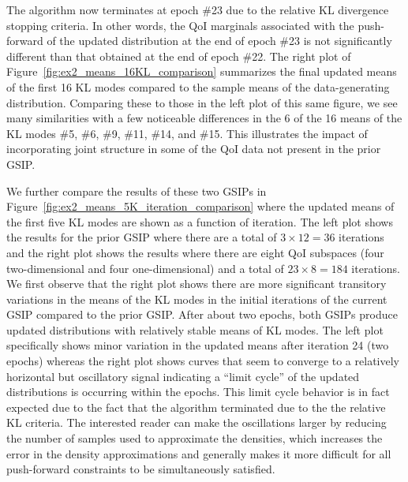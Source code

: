 \documentclass{article}
\begin{document}
The algorithm now terminates at epoch \#23 due to the relative KL divergence stopping criteria.
In other words, the QoI marginals associated with the push-forward of the updated distribution at the end of epoch \#23 is not significantly different than that obtained at the end of epoch \#22.
The right plot of Figure~\ref{fig:ex2_means_16KL_comparison} summarizes the final updated means of the first 16 KL modes compared to the sample means of the data-generating distribution.
Comparing these to those in the left plot of this same figure, we see many similarities with a few noticeable differences in the 6 of the 16 means of the KL modes \#5, \#6, \#9, \#11, \#14, and \#15. 
This illustrates the impact of incorporating joint structure in some of the QoI data not present in the prior GSIP. 

We further compare the results of these two GSIPs in Figure~\ref{fig:ex2_means_5K_iteration_comparison} where the updated means of the first five KL modes are shown as a function of iteration.
The left plot shows the results for the prior GSIP where there are a total of $3\times 12 = 36$ iterations and the right plot shows the results where there are eight QoI subspaces (four two-dimensional and four one-dimensional) and a total of $23\times 8=184$ iterations.
We first observe that the right plot shows there are more significant transitory variations in the means of the KL modes in the initial iterations of the current GSIP compared to the prior GSIP. 
After about two epochs, both GSIPs produce updated distributions with relatively stable means of KL modes. 
The left plot specifically shows minor variation in the updated means after iteration 24 (two epochs) whereas the right plot shows curves that seem to converge to a relatively horizontal but oscillatory signal indicating a ``limit cycle'' of the updated distributions is occurring within the epochs. 
This limit cycle behavior is in fact expected due to the fact that the algorithm terminated due to the the relative KL criteria. 
The interested reader can make the oscillations larger by reducing the number of samples used to approximate the densities, which increases the error in the density approximations and generally makes it more difficult for all push-forward constraints to be simultaneously satisfied. 
\end{document}
